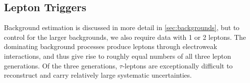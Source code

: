 \subsection{Lepton Triggers}
Background estimation is discussed in more detail in \cref{sec:backgrounds}, but to control for the larger backgrounds, we also require data with 1 or 2 leptons.
The dominating background processes produce leptons through electroweak interactions, and thus give rise to roughly equal numbers of all three lepton generations.
Of the three generations, $\tau$-leptons are exceptionally difficult to reconstruct and carry relatively large systematic uncertainties.

